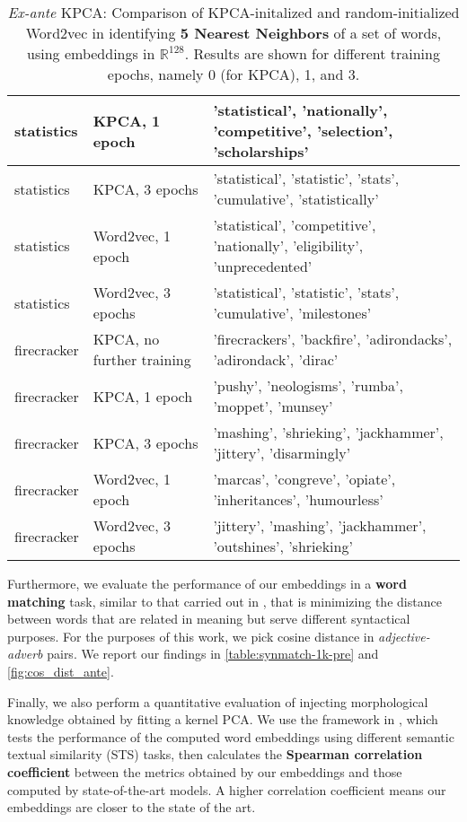 \begin{table}[h!]
\begin{tabular}{|l|l|l|}
statistics     & KPCA, 1 epoch & 'statistical', 'nationally', 'competitive', 'selection', 'scholarships'\\ \hline
statistics     & KPCA, 3 epochs & 'statistical', 'statistic', 'stats', 'cumulative', 'statistically'\\ \hline
statistics     & Word2vec, 1 epoch     & 'statistical', 'competitive', 'nationally', 'eligibility', 'unprecedented'\\ \hline
statistics     & Word2vec, 3 epochs       & 'statistical', 'statistic', 'stats', 'cumulative', 'milestones'\\ \hline
firecracker    & KPCA, no further training & 'firecrackers', 'backfire', 'adirondacks', 'adirondack', 'dirac'\\ \hline
firecracker    & KPCA, 1 epoch & 'pushy', 'neologisms', 'rumba', 'moppet', 'munsey' \\ \hline
firecracker    & KPCA, 3 epochs & 'mashing', 'shrieking', 'jackhammer', 'jittery', 'disarmingly' \\ \hline
firecracker    & Word2vec, 1 epoch      &'marcas', 'congreve', 'opiate', 'inheritances', 'humourless' \\ \hline
firecracker    & Word2vec, 3 epochs       & 'jittery', 'mashing', 'jackhammer', 'outshines', 'shrieking' \\ \hline
\end{tabular}
\caption{\textit{Ex-ante} KPCA: Comparison of KPCA-initalized and random-initialized Word2vec in identifying \textbf{5 Nearest Neighbors} of a set of words, using embeddings in $\mathbb{R}^{128}$. Results are shown for different training epochs, namely 0 (for KPCA), 1, and 3.}
\label{table:5nn-1k-pre}
\end{table}

Furthermore, we evaluate the performance of our embeddings in a \textbf{word matching} task,  similar to that carried out in \cite{mikolov_efficient_2013}, that is minimizing the distance between words that are related in meaning but serve different syntactical purposes. For the purposes of this work, we pick cosine distance in \textit{adjective-adverb} pairs. We report our findings in \cref{table:synmatch-1k-pre} and \cref{fig:cos_dist_ante}.

Finally, we also perform a quantitative evaluation of injecting morphological knowledge obtained by fitting a kernel PCA. We use the framework in \cite{conneau_senteval_2018}, which tests the performance of the computed word embeddings using different semantic textual similarity (STS) tasks, then calculates the \textbf{Spearman correlation coefficient} between the metrics obtained by our embeddings and those computed by state-of-the-art models. A higher correlation coefficient means our embeddings are closer to the state of the art. 

